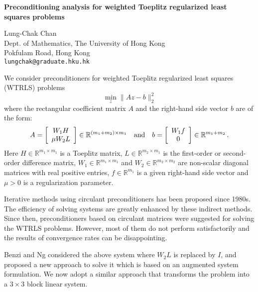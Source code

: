 \documentclass[twosided]{report}
\newcommand{\Reals}{\mathbb{R}}
\begin{document}
\begin{center}
{\large			%
{\bf Preconditioning analysis for weighted
Toeplitz regularized least squares problems}}

	Lung-Chak Chan \\
	Dept. of Mathematics, The University of Hong Kong \\
	Pokfulam Road, Hong Kong \\
	{\tt lungchak@graduate.hku.hk}
\end{center}
We consider preconditioners for weighted Toeplitz
regularized least squares (WTRLS) problems 
$$ 
\min_z \| A z - b \|_2^2
$$
where the rectangular coefficient matrix $A$ and the
right-hand side vector $b$ are of the form:
$$ 
A =
\left [
\begin{array}{c}
W_1 H \\
\mu W_2 L \\
\end{array}
\right ] \in \Reals^{(m_{1}+m_{2}) \times m_{1}} \quad {\rm and}\quad  b =
\left [
\begin{array}{c}
W_1 f \\
 0 \\
\end{array}
\right ] \in \Reals^{m_{1}+m_{2}} \,.
$$
Here $H \in \Reals^{m_{1} \times m_{1}}$ is a Toeplitz matrix, $L
\in \Reals^{m_{2} \times m_{1}}$ is the first-order or second-order
difference matrix, $W_1 \in \Reals^{m_{1} \times m_{1}}$ and $W_2
\in \Reals^{m_{2} \times m_{2}}$ are non-scalar diagonal matrices
with real positive entries, $f \in \Reals^{m_{1}}$ is a given
right-hand side vector and $\mu >0$ is a regularization parameter.

Iterative methods using circulant preconditioners has been proposed 
since 1980s. 
The efficiency of solving systems are
greatly enhanced by these indirect methods.  Since then,
preconditioners based on circulant matrices were suggested for
solving the WTRLS problems.  However, most of them do not perform
satisfactorily and the results of convergence rates can be disappointing.

Benzi and Ng 
considered the above system
where $W_{2}L$ is replaced by $I$, and proposed a new approach to
solve it which is based on an augmented system formulation. We now
adopt a similar approach that transforms the problem into a
$3 \times 3$ block linear system.
\end{document}
